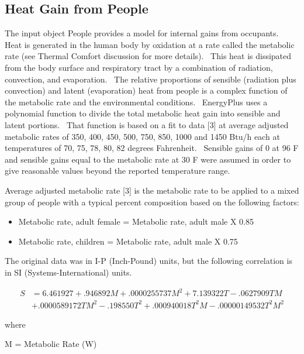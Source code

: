 \subsection{Heat Gain from People}\label{heat-gain-from-people-000}

The input object People provides a model for internal gains from occupants.~ Heat is generated in the human body by oxidation at a rate called the metabolic rate (see Thermal Comfort discussion for more details).~ This heat is dissipated from the body surface and respiratory tract by a combination of radiation, convection, and evaporation.~ The relative proportions of sensible (radiation plus convection) and latent (evaporation) heat from people is a complex function of the metabolic rate and the environmental conditions.~ EnergyPlus uses a polynomial function to divide the total metabolic heat gain into sensible and latent portions.~ That function is based on a fit to data {[}3{]} at average adjusted metabolic rates of 350, 400, 450, 500, 750, 850, 1000 and 1450 Btu/h each at temperatures of 70, 75, 78, 80, 82 degrees Fahrenheit.~ Sensible gains of 0 at 96 F and sensible gains equal to the metabolic rate at 30 F were assumed in order to give reasonable values beyond the reported temperature range.

Average adjusted metabolic rate {[}3{]} is the metabolic rate to be applied to a mixed group of people with a typical percent composition based on the following factors:

\begin{itemize}
  \item Metabolic rate, adult female = Metabolic rate, adult male X 0.85
  \item Metabolic rate, children = Metabolic rate, adult male X 0.75
\end{itemize}

The original data was in I-P (Inch-Pound) units, but the following correlation is in SI (Systems-International) units.

\begin{equation}
  \begin{array}{ll}
    S &= 6.461927 + .946892 M + .0000255737 M^2 + 7.139322 T - .0627909 T M \\
      &+ .0000589172 T M^2 - .198550 T^2 + .000940018 T^2 M - .00000149532 T^2 M^2
  \end{array}
\end{equation}

where

M = Metabolic Rate (W)


